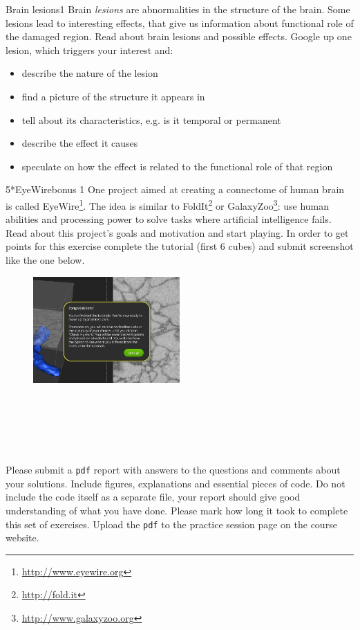 \documentclass[a4paper,11pt]{article}
\begin{document}
%
%
\begin{exercise}{4}{Brain lesions}{1}
Brain \emph{lesions} are abnormalities in the structure of the brain. Some lesions lead to interesting effects, that give us information about functional role of the damaged region. Read about brain lesions and possible effects. Google up one lesion, which triggers your interest and:
\begin{itemize}
\itemsep 0em
	\item describe the nature of the lesion
	\item find a picture of the structure it appears in
	\item tell about its characteristics, e.g. is it temporal or permanent
	\item describe the effect it causes
	\item speculate on how the effect is related to the functional role of that region
\end{itemize}
\end{exercise}


%
% 
\begin{exercise}{5*}{EyeWire}{bonus 1}
One project aimed at creating a connectome of human brain is called EyeWire\footnote{\url{http://www.eyewire.org}}. The idea is similar to FoldIt\footnote{\url{http://fold.it}} or GalaxyZoo\footnote{\url{http://www.galaxyzoo.org}}: use human abilities and processing power to solve tasks where artificial intelligence fails. Read about this project's goals and motivation and start playing. In order to get points for this exercise complete the tutorial (first 6 cubes) and submit screenshot like the one below.
\begin{figure}[H]
   \centering
   \includegraphics[width=0.5\textwidth]{eyewire.png} 
\end{figure}
\end{exercise}

\ \\
\ \\
\ \\
\ \\
\ \\
Please submit a \texttt{pdf} report with answers to the questions and comments about your solutions. Include figures, explanations and essential pieces of code. Do not include the code itself as a separate file, your report should give good understanding of what you have done. Please mark how long it took to complete this set of exercises. Upload the \texttt{pdf} to the practice session page on the course website.
\end{document}

